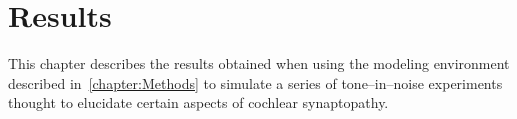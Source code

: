 \chapter{Results}
\label{chapter:Results}
\thispagestyle{myheadings}

\graphicspath{{5_Results/Figures/}}

This chapter describes the results obtained when using the modeling environment described in~\autoref{chapter:Methods} to simulate a series of tone--in--noise experiments thought to elucidate certain aspects of cochlear synaptopathy. 

